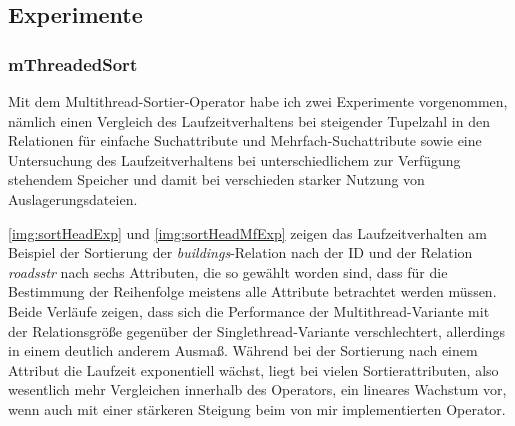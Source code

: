 \documentclass[a4paper,12pt,twoside]{article}
\newcommand{\Fb}[1]{\textit{#1}} %
\begin{document}
\subsection{Experimente}

\subsubsection{mThreadedSort}

Mit dem Multithread-Sortier-Operator habe ich zwei Experimente vorgenommen, nämlich einen Vergleich des Laufzeitverhaltens bei steigender Tupelzahl in den Relationen für einfache Suchattribute und Mehrfach-Suchattribute sowie eine Untersuchung des Laufzeitverhaltens bei unterschiedlichem zur Verfügung stehendem Speicher und damit bei verschieden starker Nutzung von Auslagerungsdateien.

\autoref{img:sortHeadExp} und \autoref{img:sortHeadMfExp} zeigen das Laufzeitverhalten am Beispiel der Sortierung der \Fb{buildings}-Relation nach der ID und der Relation \Fb{roads\-str} nach sechs Attributen, die so gewählt worden sind, dass für die Bestimmung der Reihenfolge meistens alle Attribute betrachtet werden müssen. Beide Verläufe zeigen, dass sich die Performance der Multithread-Variante mit der Relationsgröße gegenüber der Singlethread-Variante verschlechtert, allerdings in einem deutlich anderem Ausmaß. Während bei der Sortierung nach einem Attribut die Laufzeit exponentiell wächst, liegt bei vielen Sortierattributen, also wesentlich mehr Vergleichen innerhalb des Operators, ein lineares Wachstum vor, wenn auch mit einer stärkeren Steigung beim von mir implementierten Operator. 
\end{document}
